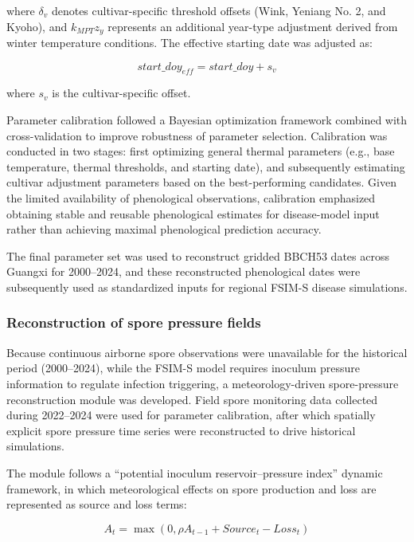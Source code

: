 \documentclass[
]{article}
\begin{document}
where \(\delta_{v}\) denotes cultivar-specific threshold offsets (Wink,
Yeniang No. 2, and Kyoho), and \(k_{MPT}z_{y}\) represents an additional
year-type adjustment derived from winter temperature conditions. The
effective starting date was adjusted as:

\begin{equation}
start\_ doy_{eff} = start\_ doy + s_{v}
\tag{18}
\end{equation}

where \(s_{v}\) is the cultivar-specific offset.

Parameter calibration followed a Bayesian optimization framework
combined with cross-validation to improve robustness of parameter
selection. Calibration was conducted in two stages: first optimizing
general thermal parameters (e.g., base temperature, thermal thresholds,
and starting date), and subsequently estimating cultivar adjustment
parameters based on the best-performing candidates. Given the limited
availability of phenological observations, calibration emphasized
obtaining stable and reusable phenological estimates for disease-model
input rather than achieving maximal phenological prediction accuracy.

The final parameter set was used to reconstruct gridded BBCH53 dates
across Guangxi for 2000--2024, and these reconstructed phenological
dates were subsequently used as standardized inputs for regional FSIM-S
disease simulations.

\subsubsection{Reconstruction of spore pressure
fields}\label{reconstruction-of-spore-pressure-fields}

Because continuous airborne spore observations were unavailable for the
historical period (2000--2024), while the FSIM-S model requires inoculum
pressure information to regulate infection triggering, a
meteorology-driven spore-pressure reconstruction module was developed.
Field spore monitoring data collected during 2022--2024 were used for
parameter calibration, after which spatially explicit spore pressure
time series were reconstructed to drive historical simulations.

The module follows a ``potential inoculum reservoir--pressure index''
dynamic framework, in which meteorological effects on spore production
and loss are represented as source and loss terms:

\begin{equation}
A_{t} = \max\left( 0,\rho A_{t - 1} + Source_{t} - Loss_{t} \right)
\tag{19}
\end{equation}
\end{document}
